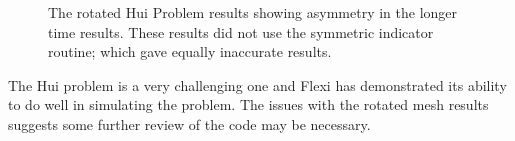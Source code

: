 \begin{figure}[h!]
\caption{The rotated Hui Problem results showing asymmetry in the longer time results.  These results did not use the symmetric indicator routine; which gave equally inaccurate results.}
\label{fig:hui-Rot}
\end{figure}

The Hui problem is a very challenging one and Flexi has demonstrated its ability to do well in simulating the problem.  The issues with the rotated mesh results suggests some further review of the code may be necessary.
